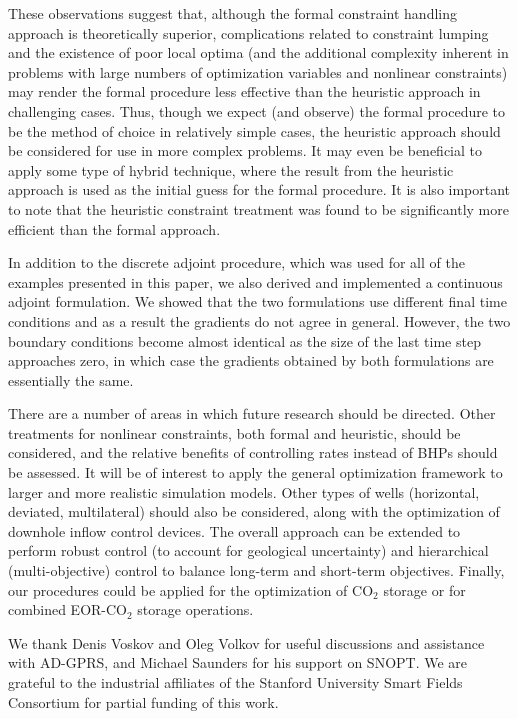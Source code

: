\documentclass[twocolumn,numbook]{svjour3}          %
\begin{document}
These observations suggest that, although the formal constraint handling approach is theoretically superior, complications related to constraint lumping and the existence of poor local optima (and the additional complexity inherent in problems with large numbers of optimization variables and nonlinear constraints) may render the formal procedure less effective than the heuristic approach in challenging cases. Thus, though we expect (and observe) the formal procedure to be the method of choice in relatively simple cases, the heuristic approach should be considered for use in more complex problems. It may even be beneficial to apply some type of hybrid technique, where the result from the heuristic approach is used as the initial guess for the formal procedure. It is also important to note that the heuristic constraint treatment was found to be significantly more efficient than the formal approach. 


In addition to the discrete adjoint procedure, which was used for all of the
examples presented in this paper, we also derived and implemented a continuous
adjoint formulation. We showed that the two formulations use different
final time conditions and as a result the gradients do not
agree in general. However, the two boundary conditions become almost identical as the
size of the last time step approaches zero, in which case the gradients obtained by
both formulations are essentially the same.

There are a number of areas in which future research should be directed. Other
treatments for nonlinear constraints, both formal and heuristic, should be
considered, and the relative benefits of controlling rates instead of BHPs
should be assessed. It will be of interest to apply the general optimization
framework to larger and more realistic simulation models. Other types of wells
(horizontal, deviated, multilateral) should also be considered, along with the
optimization of downhole inflow control devices. The overall approach can be 
extended to perform robust control (to account for geological uncertainty) and hierarchical
(multi-objective) control to balance long-term and short-term objectives. Finally, our procedures could be applied for the optimization of CO$_2$ storage or for combined
EOR-CO$_2$ storage operations.



\begin{acknowledgements} 
We thank Denis Voskov and Oleg Volkov for useful discussions and assistance with AD-GPRS, and
Michael Saunders for his support 
on SNOPT. We are grateful
to the industrial affiliates of the Stanford University Smart Fields Consortium for partial
funding of this work.
\end{acknowledgements}




\end{document}
